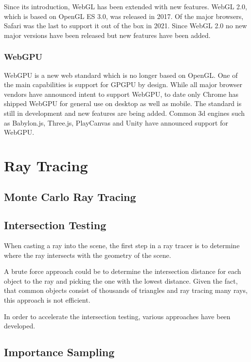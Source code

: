 Since its introduction, WebGL has been extended with new features. WebGL 2.0, which is based on OpenGL ES 3.0, was released in 2017. Of the major browsers, Safari was the last to support it out of the box in 2021. Since WebGL 2.0 no new major versions have been released but new features have been added.

\subsubsection{WebGPU}

WebGPU is a new web standard which is no longer based on OpenGL. One of the main capabilities is support for GPGPU by design. While all major browser vendors have announced intent to support WebGPU, to date only Chrome has shipped WebGPU for general use on desktop as well as mobile.
The standard is still in development and new features are being added.
Common 3d engines such as Babylon.js, Three.js, PlayCanvas and Unity have announced support for WebGPU.

\section{Ray Tracing}
\subsection{Monte Carlo Ray Tracing}
\subsection{Intersection Testing}

When casting a ray into the scene, the first step in a ray tracer is to determine where the ray intersects with the geometry of the scene.

A brute force approach could be to determine the intersection distance for each object to the ray and picking the one with the lowest distance. Given the fact, that common objects consist of thousands of triangles and ray tracing many rays, this approach is not efficient.

In order to accelerate the intersection testing, various approaches have been developed.


\subsection{Importance Sampling}

